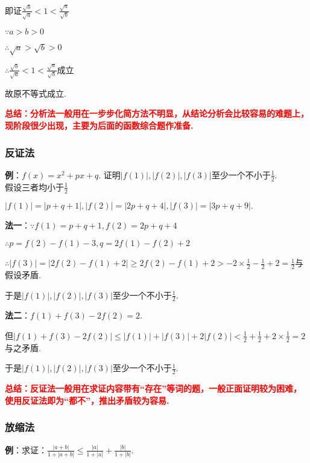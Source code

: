 \documentclass[8pt]{article}
\begin{document}
					即证$\displaystyle \frac{\sqrt{b}}{\sqrt{a}}<1<\frac{\sqrt{a}}{\sqrt{b}}$

					$\because a>b>0$

					$\therefore \sqrt{a}>\sqrt{b}>0$

					$\displaystyle \therefore\frac{\sqrt{b}}{\sqrt{a}}<1<\frac{\sqrt{a}}{\sqrt{b}}$成立

					故原不等式成立.

					\textcolor{red}{\textbf{总结：分析法一般用在一步步化简方法不明显，从结论分析会比较容易的难题上，现阶段很少出现，主要为后面的函数综合题作准备.}}

			\subsubsection{反证法}
				\textbf{例}：$f(x)=x^2+px+q$. 证明$|f(1)|, |f(2)|, |f(3)|$至少一个不小于$\displaystyle\frac{1}{2}$.
					~\\

					假设三者均小于$\displaystyle\frac{1}{2}$

					$|f(1)|=|p+q+1|, |f(2)|=|2p+q+4|, |f(3)|=|3p+q+9|.$

					\textbf{法一}：$\because f(1)=p+q+1, f(2)=2p+q+4$

					$\therefore p=f(2)-f(1)-3, q=2f(1)-f(2)+2$

					$\displaystyle \therefore |f(3)|=|2f(2)-f(1)+2|\geq 2f(2)-f(1)+2>-2\times \frac{1}{2}-\frac{1}{2}+2=\frac{1}{2}$与假设矛盾.

					于是$|f(1)|, |f(2)|, |f(3)|$至少一个不小于$\displaystyle\frac{1}{2}$.

					\textbf{法二}：$f(1)+f(3)-2f(2)=2$.

					但$|f(1)+f(3)-2f(2)|\leq|f(1)|+|f(3)|+2|f(2)|<\frac{1}{2}+\frac{1}{2}+2\times\frac{1}{2}=2$与之矛盾.

					于是$|f(1)|, |f(2)|, |f(3)|$至少一个不小于$\displaystyle\frac{1}{2}$.

					\textcolor{red}{\textbf{总结：反证法一般用在求证内容带有“存在”等词的题，一般正面证明较为困难，使用反证法即为“都不”，推出矛盾较为容易.}}

			\subsubsection{放缩法}
				\textbf{例}：求证：$\displaystyle \frac{|a+b|}{1+|a+b|}\leq\frac{|a|}{1+|a|}+\frac{|b|}{1+|b|}.$
\end{document}
